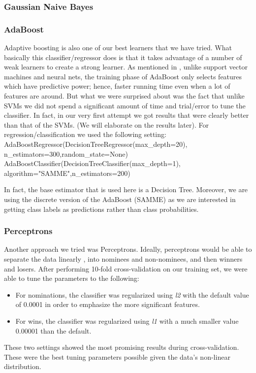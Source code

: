 \documentclass[journal,transmag]{IEEEtran}
\begin{document}
			\subsubsection{Gaussian Naive Bayes}
			
			\subsubsection{AdaBoost}
			\label{adaboost}
			Adaptive boosting is also one of our best learners that we have tried. What basically this classifier/regressor does is that it takes advantage of a number of weak learners to create a strong learner. As mentioned in \cite{adaboost}, unlike support vector machines and neural nets, the training phase of AdaBoost only selects features which have predictive power; hence, faster running time even when a lot of features are around. But what we were surprised about was the fact that unlike SVMs we did not spend a significant amount of time and trial/error to tune the classifier. In fact, in our very first attempt we got results that were clearly better than that of the SVMs. (We will elaborate on the results later). For regression/classification we used the following setting:\\
AdaBoostRegressor(DecisionTreeRegressor(max\_depth=20),\\
n\_estimators=300,random\_state=None)\\
AdaBoostClassifier(DecisionTreeClassifier(max\_depth=1),\\
algorithm="SAMME",n\_estimators=200)

In fact, the base estimator that is used here is a Decision Tree. Moreover, we are using the discrete version of the AdaBoost (SAMME) as we are interested in getting class labels as predictions rather than class probabilities.
			
			\subsubsection{Perceptrons}
			Another approach we tried was Perceptrons. Ideally, perceptrons would be able to separate the data linearly \cite{perceptron}, into nominees and non-nominees, and then winners and losers. After performing 10-fold cross-validation on our training set, we were able to tune the parameters to the following:
			\begin{itemize}
				\item For nominations, the classifier was regularized using \emph{l2} with the default value of 0.0001 in order to emphasize the more significant features.
				\item For wins, the classifier was regularized using \emph{l1} with a much smaller value 0.00001 than the default.
			\end{itemize}
			These two settings showed the most promising results during cross-validation.
			These were the best tuning parameters possible given the data's non-linear distribution.
			
\end{document}
